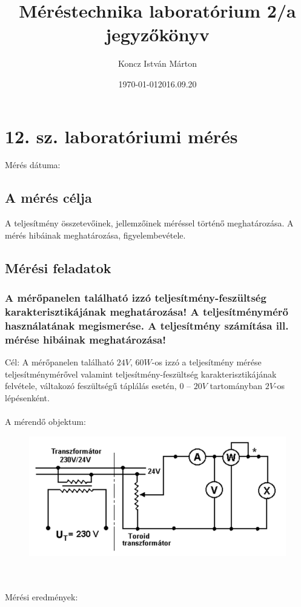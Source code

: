 \documentclass[10pt,a4paper]{article}
\begin{document}
\title{Méréstechnika laboratórium 2/a jegyzőkönyv}
\author{Koncz István Márton}
\date{\today}
\maketitle
\newpage
\section{12. sz. laboratóriumi mérés}
	Mérés dátuma:\date{2016.09.20}
	\subsection{A mérés célja}
	A teljesítmény összetevőinek, jellemzőinek méréssel történő meghatározása.
A mérés hibáinak meghatározása, figyelembevétele.
	\subsection{Mérési feladatok}
		\subsubsection{A mérőpanelen található izzó teljesítmény-feszültség karakterisztikájának meghatározása! A teljesítménymérő
használatának megismerése.
A teljesítmény számítása ill. mérése hibáinak
meghatározása!}
Cél: A mérőpanelen található $24 V$, $60 W$-os izzó a
teljesítmény mérése teljesítménymérővel valamint
teljesítmény-feszültség karakterisztikájának
felvétele, váltakozó feszültségű táplálás esetén, $0$ –
$20 V$ tartományban $2 V$-os lépésenként.\\\\
A mérendő objektum:\begin{figure}[hbtp]
\centering
\includegraphics[scale=0.5]{Toroid.png}
\caption{}
\end{figure}\\\\
Mérési eredmények:
\end{document}
